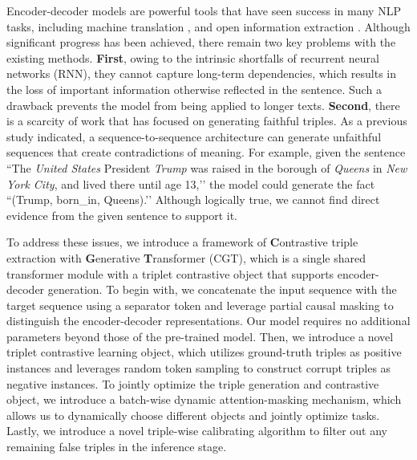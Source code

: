 \documentclass[letterpaper]{article} \usepackage{aaai21}  \usepackage{times}  \usepackage{helvet} \usepackage{courier}  \usepackage[hyphens]{url}  \usepackage{graphicx} \urlstyle{rm} \def\UrlFont{\rm}  \usepackage{natbib}  \usepackage[noend]{algpseudocode}
\begin{document}
Encoder-decoder models are powerful tools that have seen success in many NLP tasks, including machine translation \cite{cho2014learning}, and open information extraction \cite{zhang2017selective}. Although significant progress has been achieved, there remain two key problems with the existing methods. \textbf{First}, owing to the intrinsic shortfalls of recurrent neural networks (RNN), they cannot capture long-term dependencies, which results in the loss of important information otherwise reflected in the sentence. Such a drawback prevents the model from being applied to longer texts. \textbf{Second}, there is a scarcity of work that has focused on generating faithful triples. As a previous study \cite{zhu2020boosting} indicated, a sequence-to-sequence architecture can generate unfaithful sequences that create contradictions of meaning. For example, given the sentence ``The \emph{United States} President \emph{Trump} was raised in the borough of \emph{Queens} in \emph{New York City}, and lived there until age 13,’’  the model could generate the fact ``(Trump, born\_in, Queens).’’ Although logically true, we cannot find direct evidence from the given sentence to support it. 

To address these issues, we introduce a framework of \textbf{C}ontrastive triple extraction with \textbf{G}enerative \textbf{T}ransformer (CGT), which is a single shared transformer module with a triplet contrastive object that supports encoder-decoder generation. To begin with, we concatenate the input sequence with the target sequence using a separator token and leverage partial causal masking \cite{du2020document} to distinguish the encoder-decoder representations. Our model requires no additional parameters beyond those of the pre-trained model. Then, we introduce a novel triplet contrastive learning object, which utilizes ground-truth triples as positive instances and leverages random token sampling to construct corrupt triples as negative instances. To jointly optimize the triple generation and contrastive object, we introduce a batch-wise dynamic attention-masking mechanism, which allows us to dynamically choose different objects and jointly optimize tasks. Lastly, we introduce a novel triple-wise calibrating algorithm to filter out any remaining false triples in the inference stage. 
\end{document}
